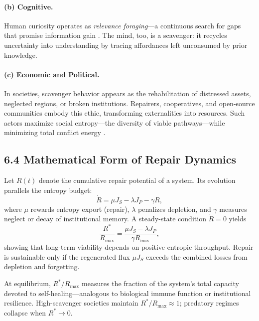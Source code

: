 \documentclass[11pt,a4paper,titlepage]{article}
\theoremstyle{definition}
\begin{document}
\paragraph{(b) Cognitive.}
Human curiosity operates as \emph{relevance foraging}—a continuous search for 
gaps that promise information gain \cite{gibson1979,calvin1996,dennett2017}.  
The mind, too, is a scavenger: it recycles uncertainty into understanding by 
tracing affordances left unconsumed by prior knowledge.

\paragraph{(c) Economic and Political.}
In societies, scavenger behavior appears as the rehabilitation of distressed 
assets, neglected regions, or broken institutions.  
Repairers, cooperatives, and open-source communities embody this ethic, 
transforming externalities into resources.  
Such actors maximize social entropy—the diversity of viable pathways—while 
minimizing total conflict energy \cite{ostrom1990,hayek1945,blakeley2024}.

\subsection{6.4 Mathematical Form of Repair Dynamics}

Let $R(t)$ denote the cumulative repair potential of a system.  
Its evolution parallels the entropy budget:
\begin{equation}
\dot{R} = \mu J_S - \lambda J_P - \gamma R,
\label{eq:repair_dynamics}
\end{equation}
where $\mu$ rewards entropy export (repair), $\lambda$ penalizes depletion, 
and $\gamma$ measures neglect or decay of institutional memory.  
A steady-state condition $\dot{R}=0$ yields
\begin{equation}
\frac{R^*}{R_{\max}} 
 = \frac{\mu J_S - \lambda J_P}{\gamma R_{\max}},
\label{eq:repair_equilibrium}
\end{equation}
showing that long-term viability depends on positive entropic throughput.  
Repair is sustainable only if the regenerated flux $\mu J_S$ exceeds the 
combined losses from depletion and forgetting.

At equilibrium, $R^*/R_{\max}$ measures the fraction of the system’s total 
capacity devoted to self-healing—analogous to biological immune function or 
institutional resilience.  
High-scavenger societies maintain $R^*/R_{\max}\!\approx\!1$;  
predatory regimes collapse when $R^*\!\to\!0$.
\end{document}
